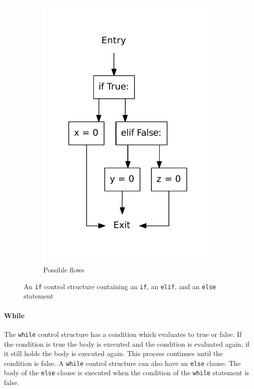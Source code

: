 \begin{figure}[H]
\begin{subfigure}[b]{0.4\textwidth}
    \includegraphics[scale=.5]{./figures/if_else_elif.pdf}
    \caption{Possible flows}
    \label{python:if:elif:flow}
  \end{subfigure}
  \caption{An \texttt{if} control structure containing an \texttt{if}, an \texttt{elif}, and an \texttt{else} statement}
  \label{python:if:elif}
\end{figure}



\paragraph{While}
The \texttt{while} control structure has a condition which evaluates to true or false.
If the condition is true the body is executed and the condition is evaluated again, if it still holds the body is executed again.
This process continues until the condition is false.
A \texttt{while} control structure can also have an \texttt{else} clause.
The body of the \texttt{else} clause is executed when the condition of the \texttt{while} statement is false.

